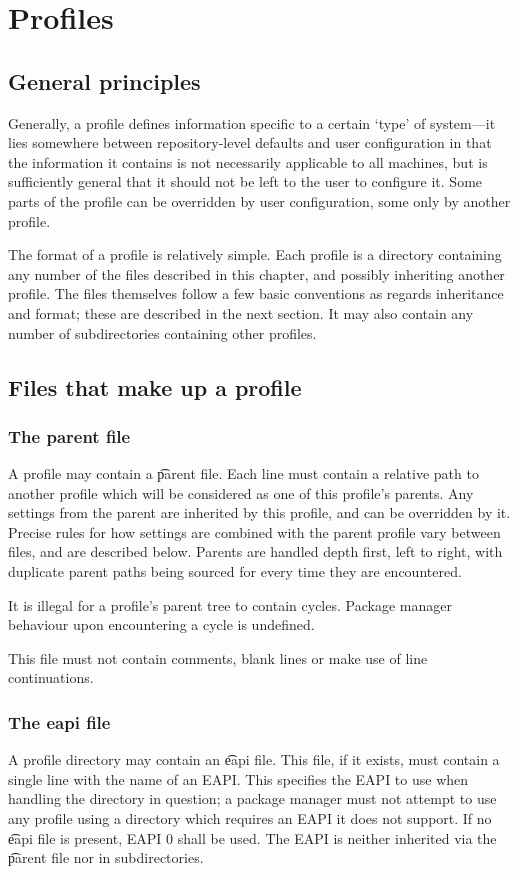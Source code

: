 \chapter{Profiles}
\label{sec:profiles}

\section{General principles}
Generally, a profile defines information specific to a certain `type' of system---it lies somewhere
between repository-level defaults and user configuration in that the information it contains is not
necessarily applicable to all machines, but is sufficiently general that it should not be left to
the user to configure it. Some parts of the profile can be overridden by user configuration, some
only by another profile.

The format of a profile is relatively simple. Each profile is a directory containing any number of
the files described in this chapter, and possibly inheriting another profile. The files themselves
follow a few basic conventions as regards inheritance and format; these are described in the next
section. It may also contain any number of subdirectories containing other profiles.

\section{Files that make up a profile}

\subsection{The parent file}
A profile may contain a \t{parent} file. Each line must contain a relative path to another profile
which will be considered as one of this profile's parents. Any settings from the parent are
inherited by this profile, and can be overridden by it. Precise rules for how settings are combined
with the parent profile vary between files, and are described below. Parents are handled depth
first, left to right, with duplicate parent paths being sourced for every time they are encountered.

It is illegal for a profile's parent tree to contain cycles. Package manager behaviour upon
encountering a cycle is undefined.

This file must not contain comments, blank lines or make use of line continuations.

\subsection{The eapi file}
\label{sec:profile-eapi}
A profile directory may contain an \t{eapi} file. This file, if it exists, must contain a single
line with the name of an EAPI\@. This specifies the EAPI to use when handling the directory in
question; a package manager must not attempt to use any profile using a directory which requires an
EAPI it does not support. If no \t{eapi} file is present, EAPI 0 shall be used. The EAPI is neither
inherited via the \t{parent} file nor in subdirectories.

